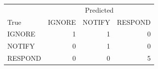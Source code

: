\begin{tabular}{lrrr}
\toprule
 & \multicolumn{3}{c}{Predicted} \\
True & IGNORE & NOTIFY & RESPOND \\
\midrule
IGNORE & 1 & 1 & 0 \\
NOTIFY & 0 & 1 & 0 \\
RESPOND & 0 & 0 & 5 \\
\bottomrule
\end{tabular}
